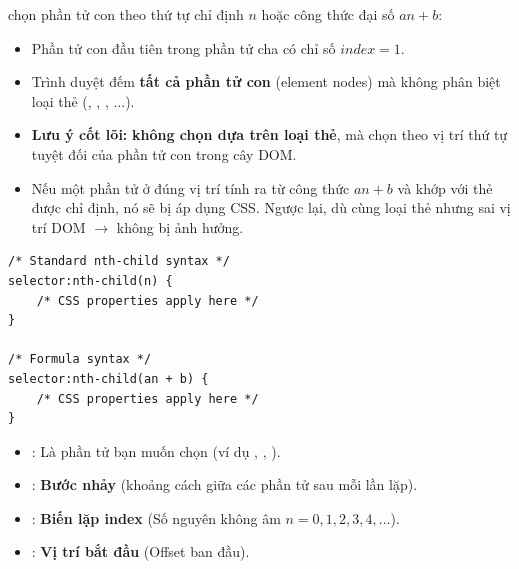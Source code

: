 \begin{conceptBox}
 chọn phần tử con theo thứ tự chỉ định $n$ hoặc công thức đại số $an + b$:
\begin{itemize}[leftmargin=1.5em, itemsep=2pt, parsep=0pt]
    \item Phần tử con đầu tiên trong phần tử cha có chỉ số $index = 1$.
    \item Trình duyệt đếm \textbf{tất cả phần tử con} (element nodes) mà không phân biệt loại thẻ (, , , ...).
    \item \textbf{Lưu ý cốt lõi:}  \textbf{không chọn dựa trên loại thẻ}, mà chọn theo vị trí thứ tự tuyệt đối của phần tử con trong cây DOM.
    \item Nếu một phần tử ở đúng vị trí tính ra từ công thức $an + b$ và khớp với thẻ được chỉ định, nó sẽ bị áp dụng CSS. Ngược lại, dù cùng loại thẻ nhưng sai vị trí DOM $\rightarrow$ không bị ảnh hưởng.
\end{itemize}
\end{conceptBox}

\begin{codeWindow}
\begin{lstlisting}[language=CSS3]
/* Standard nth-child syntax */
selector:nth-child(n) {
    /* CSS properties apply here */
}

/* Formula syntax */
selector:nth-child(an + b) {
    /* CSS properties apply here */
}
\end{lstlisting}
\end{codeWindow}

\begin{conceptBox}
\begin{itemize}[leftmargin=1.5em, itemsep=2pt, parsep=0pt]
    \item {}: Là phần tử bạn muốn chọn (ví dụ , , ).
    \item {}: \textbf{Bước nhảy} (khoảng cách giữa các phần tử sau mỗi lần lặp).
    \item {}: \textbf{Biến lặp index} (Số nguyên không âm $n = 0, 1, 2, 3, 4, \dots$).
    \item {}: \textbf{Vị trí bắt đầu} (Offset ban đầu).
\end{itemize}
\end{conceptBox}

